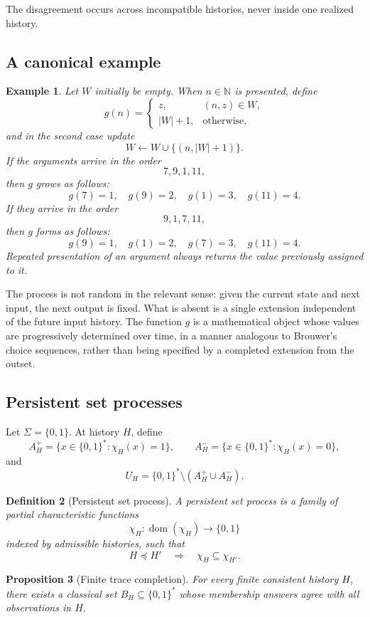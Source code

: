 \documentclass[11pt]{article}
\newtheorem{definition}{Definition}[section]
\newtheorem{proposition}[definition]{Proposition}
\newtheorem{example}[definition]{Example}
\newcommand{\bits}{\{0,1\}}
\newcommand{\strings}{\bits^*}
\begin{document}
The disagreement occurs across incompatible histories, never inside one realized history.

\subsection{A canonical example}

\begin{example}
Let \(W\) initially be empty.  When \(n\in\mathbb N\) is presented, define
\[
g(n)=
\begin{cases}
z, & (n,z)\in W,\\
|W|+1, & \text{otherwise},
\end{cases}
\]
and in the second case update
\[
W\leftarrow W\cup\{(n,|W|+1)\}.
\]
If the arguments arrive in the order
\[
7,9,1,11,
\]
then \(g\) grows as follows:
\[
g(7)=1,\quad g(9)=2,\quad g(1)=3,\quad g(11)=4.
\]
If they arrive in the order
\[
9,1,7,11,
\]
then \(g\) forms as follows:
\[
g(9)=1,\quad g(1)=2,\quad g(7)=3,\quad g(11)=4.
\]
Repeated presentation of an argument always returns the value previously assigned to it.
\end{example}

The process is not random in the relevant sense: given the current state and next input, the
next output is fixed.  What is absent is a single extension independent of the future input
history. The function \(g\) is a mathematical object whose values are progressively determined over time, in a manner analogous to Brouwer's choice sequences, rather than being specified by a completed extension from the outset. 

 

\subsection{Persistent set processes}

Let \(\Sigma=\bits\).  At history \(H\), define
\[
A_H^+=\{x\in\strings:\chi_H(x)=1\},\qquad
A_H^-=\{x\in\strings:\chi_H(x)=0\},
\]
and
\[
U_H=\strings\setminus(A_H^+\cup A_H^-).
\]

\begin{definition}[Persistent set process]
A persistent set process is a family of partial characteristic functions
\[
  \chi_H:\operatorname{dom}(\chi_H)\to\bits
\]
indexed by admissible histories, such that
\[
  H\preceq H'\quad\Longrightarrow\quad \chi_H\subseteq\chi_{H'}.
\]
\end{definition}

\begin{proposition}[Finite trace completion]\label{prop:completion}
For every finite consistent history \(H\), there exists a classical set
\(B_H\subseteq\strings\) whose membership answers agree with all observations in \(H\).
\end{proposition}
\end{document}
